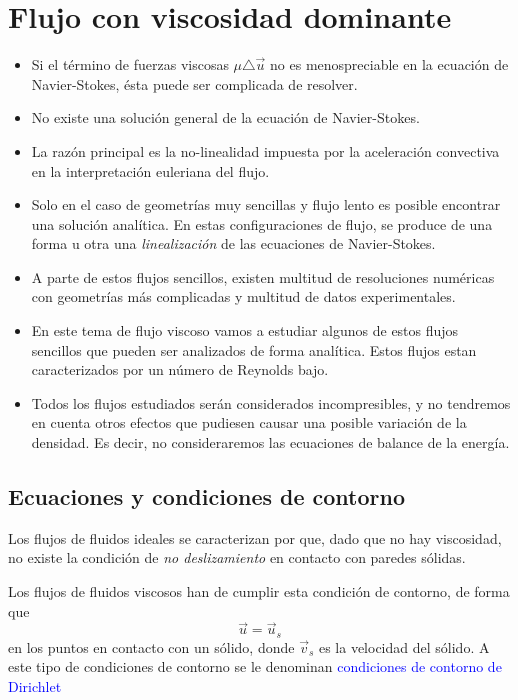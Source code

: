 \chapter{Flujo con viscosidad dominante}

	
	\begin{itemize}
		\item Si el término de fuerzas viscosas $\mu\triangle\vec{u}$ no es menospreciable
		en la ecuación de Navier-Stokes, ésta puede ser complicada de resolver.
		\item No existe una solución general de la ecuación de Navier-Stokes.
		\item La razón principal es la no-linealidad impuesta por la aceleración
		convectiva en la interpretación euleriana del flujo.
		\item Solo en el caso de geometrías muy sencillas y flujo lento es posible
		encontrar una solución analítica. En estas configuraciones de flujo,
		se produce de una forma u otra una  \textit{linealización}
		de las ecuaciones de Navier-Stokes.
		\item A parte de estos flujos sencillos, existen multitud de resoluciones
		numéricas con geometrías más complicadas y multitud de datos experimentales.
		\item En este tema de flujo viscoso vamos a estudiar algunos de estos flujos
		sencillos que pueden ser analizados de forma analítica. Estos flujos
		estan caracterizados por un número de Reynolds bajo.
		\item Todos los flujos estudiados serán considerados incompresibles, y no
		tendremos en cuenta otros efectos que pudiesen causar una posible
		variación de la densidad. Es decir, no consideraremos las ecuaciones
		de balance de la energía.
	\end{itemize}

\section{Ecuaciones y condiciones de contorno}

	
	Los flujos de fluidos ideales se caracterizan por que, dado que no
	hay viscosidad, no existe la condición de  \textit{no deslizamiento}
	en contacto con paredes sólidas.
	
			Los flujos de fluidos viscosos han de cumplir esta condición de contorno,
			de forma que 
			\[
			\vec{u}=\vec{u}_{s}
			\]
			en los puntos en contacto con un sólido, donde $\vec{v}_{s}$ es
			la velocidad del sólido. A este tipo de condiciones de contorno se
			le denominan \textcolor{blue}{condiciones de contorno de Dirichlet} %

